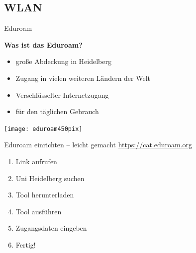 
\subsection{WLAN}
\begin{frame}{Eduroam}
    \begin{minipage}[t]{0.715\textwidth}
        \vspace{-2em}
        \large \textbf{Was ist das Eduroam?}
        \normalsize
        \begin{itemize}
            \item<1-> große Abdeckung in Heidelberg
            \item<2-> Zugang in vielen weiteren Ländern der Welt
            \item<3-> Verschlüsselter Internetzugang
            \item<4-> für den täglichen Gebrauch
        \end{itemize}
    \end{minipage}
    \begin{minipage}[t]{0.25\textwidth}
        \begin{flushright}
            \texttt{[image: eduroam450pix]}
        \end{flushright}
    \end{minipage}
\end{frame}

\begin{frame}{Eduroam einrichten -- leicht gemacht}
    \large \url{https://cat.eduroam.org} \\
    \begin{minipage}[t]{0.515\textwidth}
        \begin{enumerate}
            \item<+-> Link aufrufen
            \item<+-> \glqq{}Uni Heidelberg\grqq{} suchen
            \item<+-> Tool herunterladen
            \item<+-> Tool ausführen
            \item<+-> Zugangsdaten eingeben
            \item<+-> Fertig!
        \end{enumerate}
    \end{minipage}
    \begin{minipage}[t]{0.4\textwidth}
        \vspace{0cm}
        \begin{center}
        \end{center}
    \end{minipage}
\end{frame}


